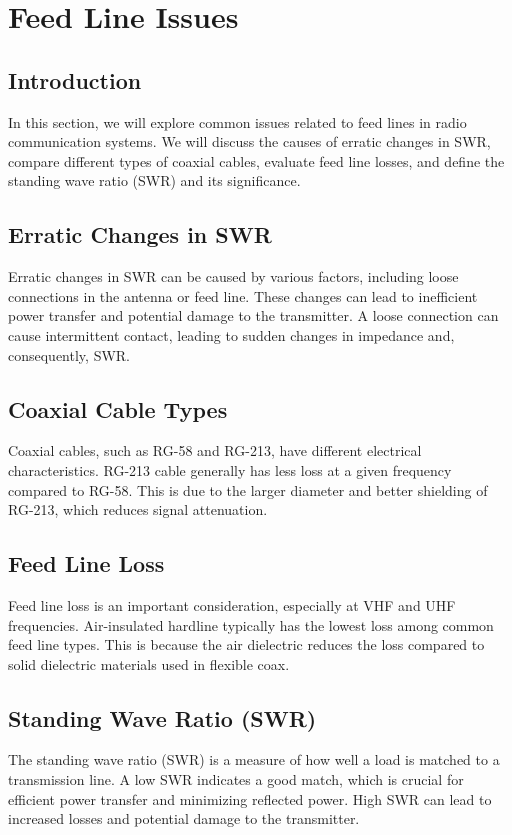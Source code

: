 \section{Feed Line Issues}
\label{section:feed_line_issues}

\subsection*{Introduction}
In this section, we will explore common issues related to feed lines in radio communication systems. We will discuss the causes of erratic changes in SWR, compare different types of coaxial cables, evaluate feed line losses, and define the standing wave ratio (SWR) and its significance.

\subsection*{Erratic Changes in SWR}
Erratic changes in SWR can be caused by various factors, including loose connections in the antenna or feed line. These changes can lead to inefficient power transfer and potential damage to the transmitter. A loose connection can cause intermittent contact, leading to sudden changes in impedance and, consequently, SWR.

\subsection*{Coaxial Cable Types}
Coaxial cables, such as RG-58 and RG-213, have different electrical characteristics. RG-213 cable generally has less loss at a given frequency compared to RG-58. This is due to the larger diameter and better shielding of RG-213, which reduces signal attenuation.

\subsection*{Feed Line Loss}
Feed line loss is an important consideration, especially at VHF and UHF frequencies. Air-insulated hardline typically has the lowest loss among common feed line types. This is because the air dielectric reduces the loss compared to solid dielectric materials used in flexible coax.

\subsection*{Standing Wave Ratio (SWR)}
The standing wave ratio (SWR) is a measure of how well a load is matched to a transmission line. A low SWR indicates a good match, which is crucial for efficient power transfer and minimizing reflected power. High SWR can lead to increased losses and potential damage to the transmitter.

